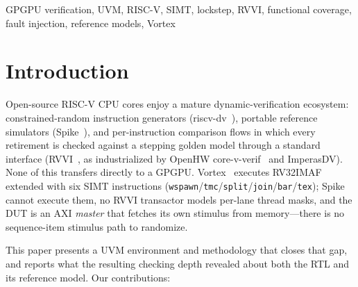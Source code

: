 \documentclass[conference]{IEEEtran}
\newcommand{\code}[1]{\texttt{\small #1}}
\begin{document}
\begin{IEEEkeywords}
GPGPU verification, UVM, RISC-V, SIMT, lockstep, RVVI, functional
coverage, fault injection, reference models, Vortex
\end{IEEEkeywords}

\section{Introduction}
\label{sec:intro}

Open-source RISC-V CPU cores enjoy a mature dynamic-verification
ecosystem: constrained-random instruction generators
(riscv-dv~\cite{riscvdv}), portable reference simulators
(Spike~\cite{spike}), and per-instruction comparison flows in which
every retirement is checked against a stepping golden model through a
standard interface (RVVI~\cite{rvvi}, as industrialized by OpenHW
core-v-verif~\cite{corevverif} and ImperasDV). None of this transfers
directly to a GPGPU. Vortex~\cite{vortex-micro,vortex-carrv} executes
RV32IMAF extended with six SIMT instructions
(\code{wspawn}/\code{tmc}/\code{split}/\code{join}/\code{bar}/\code{tex});
Spike cannot execute them, no RVVI transactor models per-lane thread
masks, and the DUT is an AXI \emph{master} that fetches its own
stimulus from memory---there is no sequence-item stimulus path to
randomize.

This paper presents a UVM environment and methodology that closes that
gap, and reports what the resulting checking depth revealed about both
the RTL and its reference model. Our contributions:
\end{document}
